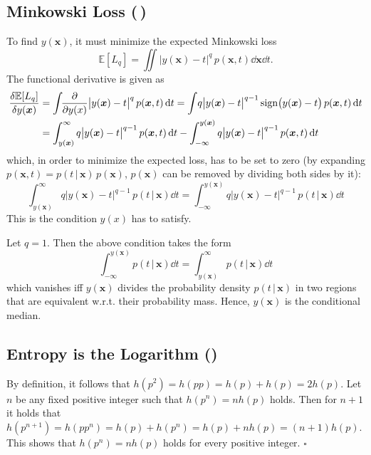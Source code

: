 \documentclass[11pt, a4paper]{scrartcl}
\newcommand{\E}{\mathbb{E}}
\renewcommand{\vec}[1]{\bm{#1}}
\newcommand{\given}{\,\vert\,}
\newcommand{\qed}{\hfill\(\square\)}
\newcommand{\diffstar}{\texorpdfstring{\raisebox{-1pt}{\resizebox{!}{8pt}{\(\star\)}}}{*}}
\newcommand{\onestar}  {(\diffstar)}
\newcommand{\twostar}  {(\diffstar\,\diffstar)}
\begin{document}
		\subsection{Minkowski Loss  \twostar}
			To find \( y(\vec{x}) \), it must minimize the expected Minkowski loss
			\begin{equation}
				\E[L_q] = \iint\! \big\lvert y(\vec{x}) - t \big\rvert^q \, p(\vec{x}, t) \dd{\vec{x}} \dd{t}.
			\end{equation}
			The functional derivative is given as
			\begin{align}
				\fdv{\E[L_q]}{y(\vec{x})}
					&= \int\!\! \pdv{y(x)} \big\lvert y(\vec{x}) - t \big\rvert^q \, p(\vec{x}, t) \dd{t}
					 = \int\! q \big\lvert y(\vec{x}) - t \big\rvert^{q - 1} \, \mathrm{sign}\big( y(\vec{x}) - t \big) \, p(\vec{x}, t) \dd{t} \\
					&= \int_{y(\vec{x})}^{\infty} q \big\lvert y(\vec{x}) - t \big\rvert^{q - 1} \, p(\vec{x}, t) \dd{t} - \int_{-\infty}^{y(\vec{x})} q \big\lvert y(\vec{x}) - t \big\rvert^{q - 1} \, p(\vec{x}, t) \dd{t}
			\end{align}
			which, in order to minimize the expected loss, has to be set to zero (by expanding \( p(\vec{x}, t) = p(t \given \vec{x}) \, p(\vec{x}) \), \( p(\vec{x}) \) can be removed by dividing both sides by it):
			\begin{equation}
				\int_{y(\vec{x})}^{\infty} q \big\lvert y(\vec{x}) - t \big\rvert^{q - 1} \, p(t \given \vec{x}) \dd{t}
				=
				\int_{-\infty}^{y(\vec{x})} q \big\lvert y(\vec{x}) - t \big\rvert^{q - 1} \, p(t \given \vec{x}) \dd{t}
			\end{equation}
			This is the condition \( y(x) \) has to satisfy.

			Let \( q = 1 \). Then the above condition takes the form
			\begin{equation}
				\int_{-\infty}^{y(\vec{x})} p(t \given \vec{x}) \dd{t} = \int_{y(\vec{x})}^{\infty} p(t \given \vec{x}) \dd{t}
			\end{equation}
			which vanishes iff \( y(\vec{x}) \) divides the probability density \( p(t \given \vec{x}) \) in two regions that are equivalent w.r.t. their probability mass. Hence, \( y(\vec{x}) \) is the conditional median.


		\subsection{Entropy is the Logarithm  \onestar}
			By definition, it follows that \( h(p^2) = h(p p) = h(p) + h(p) = 2 h(p) \). Let \(n\) be any fixed positive integer such that \( h(p^n) = n h(p) \) holds. Then for \(n + 1\) it holds that \( h(p^{n + 1}) = h(p p^n) = h(p) + h(p^n) = h(p) + n h(p) = (n + 1) h(p) \). This shows that \( h(p^n) = n h(p) \) holds for every positive integer. \qed
\end{document}
